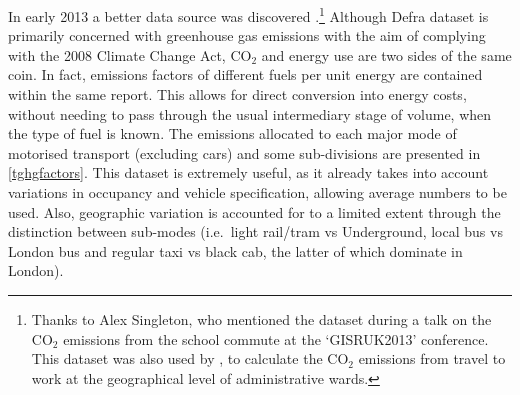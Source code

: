 In early 2013 a better data source was discovered
\citep{Defra2011}.\footnote{Thanks to Alex Singleton, who mentioned the dataset
during a talk on the CO$_2$ emissions from the school commute at the `GISRUK2013'
conference. This dataset was also used by \citet{smith2011polycentricity},
to calculate the CO$_2$ emissions from travel to work at the geographical
level of administrative wards.
}
Although Defra dataset is primarily concerned with greenhouse gas
emissions with the aim of complying with the 2008 Climate Change Act,
CO$_2$ and energy use are two sides of the same coin. In fact,
emissions factors of different fuels per unit energy are contained within the
same report. This allows
for direct conversion into energy costs, without needing to pass
through the usual intermediary stage of volume, when the type of fuel is known.
The emissions allocated
to each major mode of motorised transport (excluding cars)
and some sub-divisions are presented in \cref{tghgfactors}.
This dataset is extremely useful, as it already takes into account
variations in occupancy and vehicle specification, allowing average numbers to be used.
Also, geographic variation
is accounted for to a limited extent through the distinction between sub-modes
(i.e.~light rail/tram vs Underground, local bus vs London bus and regular taxi
vs black cab, the latter of which dominate in London).

